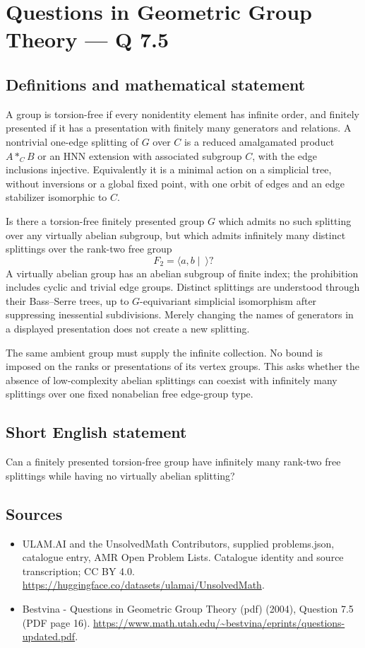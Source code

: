 \documentclass[11pt,a4paper]{article}
\begin{document}
\section*{Questions in Geometric Group Theory — Q 7.5}\label{statement}

\subsection{Definitions and mathematical statement}
A group is torsion-free if every nonidentity element has infinite order, and finitely presented if it has a presentation with finitely many generators and relations. A nontrivial one-edge splitting of $G$ over $C$ is a reduced amalgamated product $A*_C B$ or an HNN extension with associated subgroup $C$, with the edge inclusions injective. Equivalently it is a minimal action on a simplicial tree, without inversions or a global fixed point, with one orbit of edges and an edge stabilizer isomorphic to $C$.

Is there a torsion-free finitely presented group $G$ which admits no such splitting over any virtually abelian subgroup, but which admits infinitely many distinct splittings over the rank-two free group
\[
 F_2=\langle a,b\mid\ \rangle?
\]
A virtually abelian group has an abelian subgroup of finite index; the prohibition includes cyclic and trivial edge groups. Distinct splittings are understood through their Bass--Serre trees, up to $G$-equivariant simplicial isomorphism after suppressing inessential subdivisions. Merely changing the names of generators in a displayed presentation does not create a new splitting.

The same ambient group must supply the infinite collection. No bound is imposed on the ranks or presentations of its vertex groups. This asks whether the absence of low-complexity abelian splittings can coexist with infinitely many splittings over one fixed nonabelian free edge-group type.
\subsection{Short English statement}
Can a finitely presented torsion-free group have infinitely many rank-two free splittings while having no virtually abelian splitting?
\subsection{Sources}
\begin{itemize}
\item[S1] ULAM.AI and the UnsolvedMath Contributors, supplied problems.json, catalogue entry, AMR Open Problem Lists. Catalogue identity and source transcription; CC BY 4.0.
\url{https://huggingface.co/datasets/ulamai/UnsolvedMath}.
\item[S2] Bestvina - Questions in Geometric Group Theory (pdf) (2004), Question 7.5 (PDF page 16). 
\url{https://www.math.utah.edu/~bestvina/eprints/questions-updated.pdf}.
\end{itemize}
\end{document}
